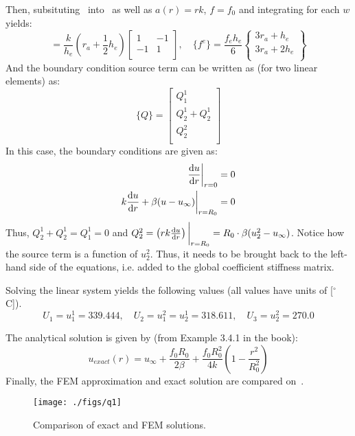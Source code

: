Then, subsituting~ into~ as well as $a(r) = rk$, $f = f_0$
and integrating for each $w$ yields:
\begin{equation}
    [K^e] = \frac{k}{h_e}(r_a + \frac{1}{2}h_e) \left[ \begin{array}{cc}
        1 & -1\\ -1 & 1\\ \end{array} \right],
    \quad \{f^e\} = \frac{f_e h_e}{6} \left \{ \begin{array}{c}
        3r_a + h_e\\ 3r_a + 2h_e\\ \end{array} \right \}
\end{equation}
And the boundary condition source term can be written as (for two linear elements) as:
$$
    \{Q\} = \left[ \begin{array}{c} Q_1^1 \\ Q^1_2 + Q_2^1 \\ Q_2^2\\ \end{array} \right]
$$
In this case, the boundary conditions are given as:
\begin{align}
     \frac{\text{d}u}{\text{d}r}\bigg|_{r=0} &= 0\\
    k  \frac{\text{d}u}{\text{d}r} + \beta(u - u_\infty)\bigg|_{r=R_0} &= 0
\end{align}
Thus, $Q^1_2 + Q_2^1 = Q_1^1 = 0$ and
$Q_2^2 = \left(r k  \frac{\text{d}u}{\text{d}r} \right) \bigg|_{r=R_0} = R_0 \cdot \beta(u^2_2 - u_\infty)$.
Notice how the source term is a function of $u^2_2$. Thus, it needs to be brought back
to the left-hand side of the equations, i.e. added to the global coefficient stiffness
matrix.

Solving the linear system yields the following values (all values have units of [$^\circ$C]).
$$
    U_1 = u_1^1 = 339.444, \quad U_2 = u_1^2 = u_2^1 = 318.611, \quad U_3 = u_2^2 = 270.0
$$

The analytical solution is given by (from Example 3.4.1 in the book):
\begin{equation}
    u_{exact}(r) = u_\infty + \frac{f_0 R_0}{2\beta} + \frac{f_0 R_0^2}{4k}\left(
        1 - \frac{r^2}{R_0^2} \right)
\end{equation}
Finally, the FEM approximation and exact solution are compared on~.
\begin{figure}[H]
    \centering
    \texttt{[image: ./figs/q1]}
    \caption{Comparison of exact and FEM solutions.}\label{fig:q1}
\end{figure}


